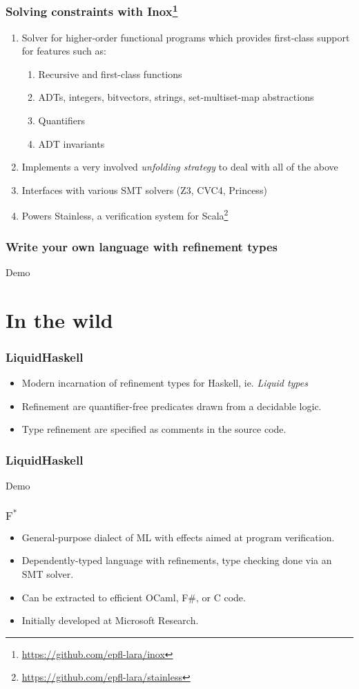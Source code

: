 \documentclass[ignorenonframetext,]{beamer}
\begin{document}
\frame
{
  \frametitle{Solving constraints with Inox\footnote{\url{https://github.com/epfl-lara/inox}}}
  
  \begin{enumerate}
    \item Solver for higher-order functional programs which provides first-class support for features such as:
    
    \begin{enumerate}
    \item Recursive and first-class functions
    \item ADTs, integers, bitvectors, strings, set-multiset-map abstractions
    \item Quantifiers
     \item ADT invariants
     \end{enumerate}
    \item Implements a very involved \textit{unfolding strategy} to deal with all of the above \cite{leon, inox1, inox2}
     \item Interfaces with various SMT solvers (Z3, CVC4, Princess)
     \item Powers Stainless, a verification system for Scala\footnote{\url{https://github.com/epfl-lara/stainless}}
  \end{enumerate}
}

\frame
{
  \frametitle{Write your own language with refinement types}
  
  Demo
}

\section{In the wild}

\frame
{
  \frametitle{LiquidHaskell}
  
  \begin{itemize}
    \item Modern incarnation of refinement types for Haskell, ie. \textit{Liquid types} \cite{liquid}
    \item Refinement are quantifier-free predicates drawn from a decidable logic. \cite{liquid}
    \item Type refinement are specified as comments in the source code.
  \end{itemize}
}

\frame
{
  \frametitle{LiquidHaskell}
  
  Demo
}

\frame
{
  \frametitle{$\text{F}^\ast$}
  
  \begin{itemize}
    \item General-purpose dialect of ML with effects aimed at program verification.
    \item Dependently-typed language with refinements, type checking done via an SMT solver.
    \item Can be extracted to efficient OCaml, F#, or C code.
    \item Initially developed at Microsoft Research.
  \end{itemize}
}
\end{document}
